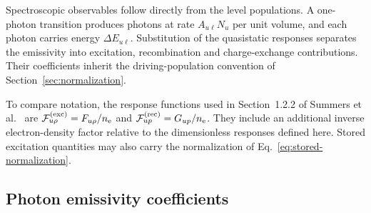 \documentclass[11pt,a4paper]{article}
\newcommand{\nelec}{n_{\mathrm e}}
\numberwithin{equation}{section}
\begin{document}
Spectroscopic observables follow directly from the level populations.
A one-photon transition produces photons at rate $A_{u\ell}N_u$ per
unit volume, and each photon carries energy $\Delta E_{u\ell}$.
Substitution of the quasistatic responses separates the emissivity
into excitation, recombination and charge-exchange contributions.
Their coefficients inherit the driving-population convention of
Section~\ref{sec:normalization}.

To compare notation, the response functions used in Section~1.2.2 of
Summers et al.~\cite{summers2006} are
$\mathcal F^{\rm (exc)}_{u\rho}=F_{u\rho}/\nelec$ and
$\mathcal F^{\rm (rec)}_{up}=G_{up}/\nelec$. They include an additional
inverse electron-density factor relative to the dimensionless
responses defined here. Stored excitation quantities may also carry
the normalization of Eq.~\eqref{eq:stored-normalization}.

\subsection{Photon emissivity coefficients}
\end{document}
